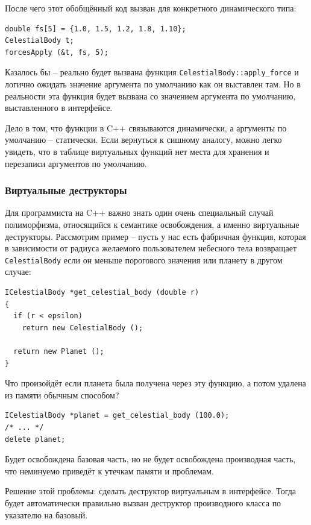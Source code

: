 \documentclass[a4paper,12pt,oneside]{article}
\begin{document}
После чего этот обобщённый код вызван для конкретного динамического типа:

\begin{lstlisting}
double fs[5] = {1.0, 1.5, 1.2, 1.8, 1.10};
CelestialBody t;
forcesApply (&t, fs, 5);
\end{lstlisting}

Казалось бы -- реально будет вызвана функция \lstinline!CelestialBody::apply_force! и логично ожидать значение аргумента по умолчанию как он выставлен там. Но в реальности эта функция будет вызвана со значением аргумента по умолчанию, выставленного в интерфейсе.

Дело в том, что функции в C++ связываются динамически, а аргументы по умолчанию – статически. Если вернуться к сишному аналогу, можно легко увидеть, что в таблице виртуальных функций нет места для хранения и перезаписи аргументов по умолчанию.

\subsubsection{Виртуальные деструкторы}\label{virtdestr}

Для программиста на C++ важно знать один очень специальный случай полиморфизма, относящийся к семантике освобождения, а именно виртуальные деструкторы. Рассмотрим пример – пусть у нас есть фабричная функция, которая в зависимости от радиуса желаемого пользователем небесного тела возвращает \lstinline!CelestialBody! если он меньше порогового значения или планету в другом случае:

\begin{lstlisting}
ICelestialBody *get_celestial_body (double r)
{
  if (r < epsilon)
    return new CelestialBody ();

  return new Planet ();
}
\end{lstlisting}

Что произойдёт если планета была получена через эту функцию, а потом удалена из памяти обычным способом?

\begin{lstlisting}
ICelestialBody *planet = get_celestial_body (100.0);
/* ... */
delete planet;
\end{lstlisting}

Будет освобождена базовая часть, но не будет освобождена производная часть, что неминуемо приведёт к утечкам памяти и проблемам. 

Решение этой проблемы: сделать деструктор виртуальным в интерфейсе. Тогда будет автоматически правильно вызван деструктор производного класса по указателю на базовый.
\end{document}
